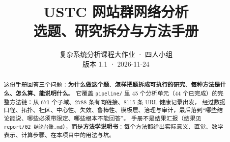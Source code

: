 \documentclass[11pt,a4paper]{ctexart}
\title{\textbf{USTC 网站群网络分析\\[4pt]
选题、研究拆分与方法手册}}
\author{复杂系统分析课程大作业 · 四人小组\\[3pt]
\small 版本 1.1 · 2026-11-24}
\date{}
\newcommand{\code}[1]{\texttt{#1}}
\begin{document}
\maketitle

\begin{abstract}
\noindent
这份手册回答三个问题：\textbf{为什么做这个题}、\textbf{怎样把题拆成可执行的研究}、\textbf{每种方法是什么、怎么算、能说明什么}。
它覆盖 \code{pipeline/} 里 45 个分析单元（44 个已完成）的完整方法链：从 671 个子域、2788 条有向链接、8115 条 URL 健康记录出发，
经过数据口径、拓扑、社区、中心性、失效、鲁棒性、模板层、治理与审计，最后落到“哪些结论能说、哪些必须带限定、哪些根本不能回答”。
手册不是结果汇报（结果见 \code{report/02\_结论台账.md}），而是\textbf{方法学说明书}：每个方法都给出实际意义、直觉、数学表示、计算步骤、在本项目中的用法与坑。
\end{abstract}

\tableofcontents
\newpage








\end{document}
